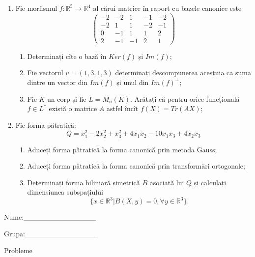 \documentclass{article}
\begin{document}
\begin{enumerate}
 \item Fie morfismul $f:\mathbb{R}^5 \to \mathbb{R}^4$ al cărui matrice în raport cu bazele canonice este
$$\begin{pmatrix}
-2&-2&1&-1&-2\\
-2&1&1&-2&-1\\
0&-1&1&1&2\\
2&-1&-1&2&1
\end{pmatrix}$$

\begin{enumerate}
\item Determinați cîte o bază în $Ker(f)$ și $Im(f)$;
\item Fie vectorul $v=(1,3,1,3)$ determinați descompunerea acestuia ca suma dintre un vector din $Im(f)$ și unul din $Im(f)^\perp$;
\item Fie $K$ un corp și fie $L=M_n(K)$. Arătați că pentru orice funcțională $f \in L^*$ există o matrice $A$ astfel încît $f(X)=Tr(AX)$;
\end{enumerate}
\item Fie forma pătratică:
$$Q= x_1^2-2x_2^2+x_3^2+4x_1x_2-10x_1x_3+4x_2x_3$$

\begin{enumerate}
\item Aduceți forma pătratică la forma canonică prin metoda Gauss;
\item Aduceți forma pătratică la forma canonică prin transformări ortogonale;
\item Determinați forma biliniară simetrică $B$ asociată lui $Q$ și calculați dimensiunea subspațiului
$$\{x \in \mathbb{R}^3 | B(X,y)=0,\forall y \in \mathbb{R}^3\}.$$

\end{enumerate}
\end{enumerate}
\newpage
\begin{flushright}
Nume:\_\_\_\_\_\_\_\_\_\_\_\_\_\_
 
 
Grupa:\_\_\_\_\_\_\_\_\_\_\_\_\_\_
\end{flushright}
\begin{center}
\vspace{2cm}
{\Large Probleme}
\vspace{2cm}
\end{center}
\end{document}
